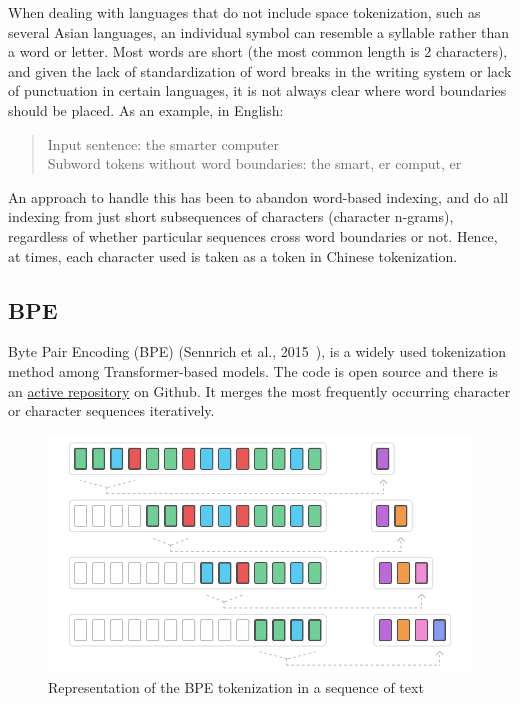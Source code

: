 When dealing with languages that do not include space tokenization, such as several Asian languages, an individual symbol can resemble a syllable rather than a word or letter. Most words are short (the most common length is 2 characters), and given the lack of standardization of word breaks in the writing system or lack of punctuation in certain languages, it is not always clear where word boundaries should be placed. As an example, in English:

\begin{quote}
    Input sentence: the smarter computer\\
    Subword tokens without word boundaries: the smart, er comput, er
\end{quote}

An approach to handle this has been to abandon word-based indexing, and do all indexing from just short subsequences of characters (character n-grams), regardless of whether particular sequences cross word boundaries or not. Hence, at times, each character used is taken as a token in Chinese tokenization.

\subsection{BPE}

Byte Pair Encoding (BPE) (Sennrich et al., 2015~\cite{sennrich2015neural}), is a widely used tokenization method among Transformer-based models. The code is open source and there is an \href{https://github.com/rsennrich/subword-nmt}{active repository} on Github. It merges the most frequently occurring character or character sequences iteratively.

\begin{figure}[!ht]
    \centering
    \includegraphics[width=14cm]{figures/bpe.png}
    \caption{Representation of the BPE tokenization in a sequence of text}
\end{figure}

